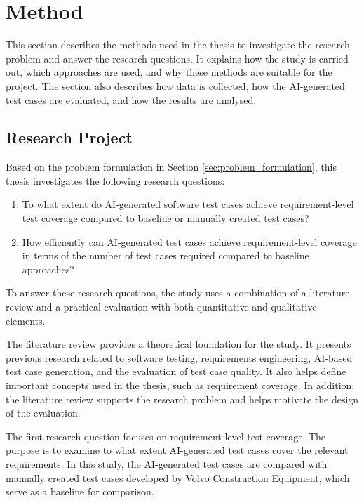 \documentclass[a4paper,12pt]{article}
\begin{document}
\newpage

\section{Method}
\label{method}
This section describes the methods used in the thesis to investigate the research problem and answer the research questions. It explains how the study is carried out, which approaches are used, and why these methods are suitable for the project. The section also describes how data is collected, how the AI-generated test cases are evaluated, and how the results are analysed.

\subsection{Research Project}
Based on the problem formulation in Section \ref{sec:problem_formulation}, this thesis investigates the following research questions:

\begin{enumerate}
    \item To what extent do AI-generated software test cases achieve requirement-level test coverage compared to baseline or manually created test cases? 
    \item How efficiently can AI-generated test cases achieve requirement-level coverage in terms of the number of test cases required compared to baseline approaches?
\end{enumerate}

To answer these research questions, the study uses a combination of a literature review and a practical evaluation with both quantitative and qualitative elements.

The literature review provides a theoretical foundation for the study. It presents previous research related to software testing, requirements engineering, AI-based test case generation, and the evaluation of test case quality. It also helps define important concepts used in the thesis, such as requirement coverage. In addition, the literature review supports the research problem and helps motivate the design of the evaluation.

The first research question focuses on requirement-level test coverage. The purpose is to examine to what extent AI-generated test cases cover the relevant requirements. In this study, the AI-generated test cases are compared with manually created test cases developed by Volvo Construction Equipment, which serve as a baseline for comparison.
\end{document}
